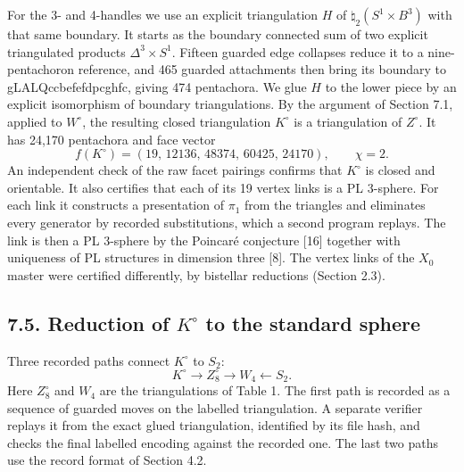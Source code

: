 \documentclass[11pt,letterpaper]{article}
\begin{document}
For the 3- and 4-handles we use an explicit triangulation $H$ of $\natural_2(S^1\times B^3)$ with that same boundary. It starts as the boundary connected sum of two explicit triangulated products $\Delta^3\times S^1$. Fifteen guarded edge collapses reduce it to a nine-pentachoron reference, and 465 guarded attachments then bring its boundary to \mbox{\small\ttfamily gLALQccbefefdpcghfc}, giving 474 pentachora. We glue $H$ to the lower piece by an explicit isomorphism of boundary triangulations. By the argument of Section 7.1, applied to $W^\circ$, the resulting closed triangulation $K^\circ$ is a triangulation of $Z^\circ$. It has 24,170 pentachora and face vector
\[
f(K^\circ)=(19,\,12136,\,48374,\,60425,\,24170),\qquad \chi=2.
\]
An independent check of the raw facet pairings confirms that $K^\circ$ is closed and orientable. It also certifies that each of its 19 vertex links is a PL 3-sphere. For each link it constructs a presentation of $\pi_1$ from the triangles and eliminates every generator by recorded substitutions, which a second program replays. The link is then a PL 3-sphere by the Poincaré conjecture [16] together with uniqueness of PL structures in dimension three [8]. The vertex links of the $X_0$ master were certified differently, by bistellar reductions (Section 2.3).

\subsection*{7.5. Reduction of $K^\circ$ to the standard sphere}
Three recorded paths connect $K^\circ$ to $S_2$:
\[
K^\circ\longrightarrow Z^\circ_8\longrightarrow W_4\longleftarrow S_2 .
\]
Here $Z^\circ_8$ and $W_4$ are the triangulations of Table 1. The first path is recorded as a sequence of guarded moves on the labelled triangulation. A separate verifier replays it from the exact glued triangulation, identified by its file hash, and checks the final labelled encoding against the recorded one. The last two paths use the record format of Section 4.2.
\end{document}
